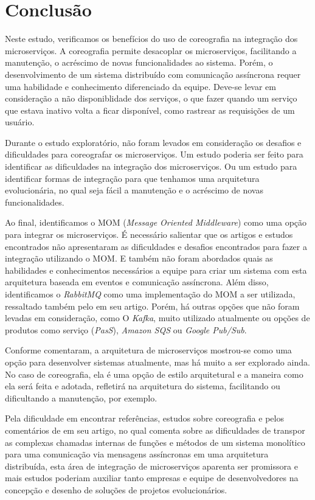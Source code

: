 \documentclass[12pt]{article}
\theoremstyle{plain}
\begin{document}
\section{Conclusão}
\label{sec:conclusao}

Neste estudo, verificamos os benefícios do uso de coreografia na integração dos microserviços. A coreografia permite desacoplar os microserviços, facilitando a manutenção, o acréscimo de novas funcionalidades ao sistema. Porém, o desenvolvimento de um sistema distribuído com comunicação assíncrona requer uma habilidade e conhecimento diferenciado da equipe. Deve-se levar em consideração a não disponiblidade dos serviços, o que fazer quando um serviço que estava inativo volta a ficar disponível, como rastrear as requisições de um usuário. 

Durante o estudo exploratório, não foram levados em consideração os desafios e dificuldades para coreografar os microserviços. Um estudo poderia ser feito para identificar as dificuldades na integração dos microserviços. Ou um estudo para identificar formas de integração para que tenhamos uma arquitetura evolucionária\footnotemark[2], no qual seja fácil a manutenção e o acréscimo de novas funcionalidades. 

Ao final, identificamos o MOM (\textit{Message Oriented Middleware}) como uma opção para integrar os microserviços. É necessário salientar que os artigos e estudos encontrados não apresentaram as dificuldades e desafios encontrados para fazer a integração utilizando o MOM. E também não foram abordados quais as habilidades e conhecimentos necessários a equipe para criar um sistema com esta arquitetura baseada em eventos e comunicação assíncrona. Além disso, identificamos o \textit{RabbitMQ} como uma implementação do MOM a ser utilizada, ressaltado também pelo \cite{martinfowler-microservices:2014} em seu artigo. Porém, há outras opções que não foram levadas em consideração, como O \textit{Kafka}, muito utilizado atualmente ou opções de produtos como serviço (\textit{PasS}), \textit{Amazon SQS} ou \textit{Google Pub/Sub}.

Conforme \cite{martinfowler-microservices:2014} comentaram, a arquitetura de microserviços mostrou-se como uma opção para desenvolver sistemas atualmente, mas há muito a ser explorado ainda. No caso de coreografia, ela é uma opção de estilo arquitetural e a maneira como ela será feita e adotada, refletirá na arquitetura do sistema, facilitando ou dificultando a manutenção, por exemplo. 

Pela dificuldade em encontrar referências, estudos sobre coreografia e pelos comentários de \cite{martinfowler-microservices:2014} em seu artigo, no qual comenta sobre as dificuldades de transpor as complexas chamadas internas de funções e métodos de um sistema monolítico para uma comunicação via mensagens assíncronas em uma arquitetura distribuída, esta área de integração de microserviços aparenta ser promissora e mais estudos poderiam auxiliar tanto empresas e equipe de desenvolvedores na concepção e desenho de soluções de projetos evolucionários\footnotemark[2].




\end{document}
